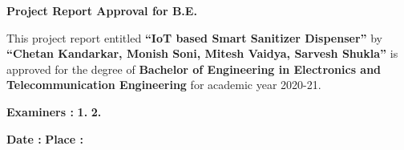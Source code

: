 \newpage
\thispagestyle{empty}
\begin{center}
\LARGE \textbf { {Project Report Approval for B.E.} }
\end{center}

	\vspace{0.5cm}


      This project report entitled \textbf{\textquotedblleft  IoT based Smart Sanitizer Dispenser\textquotedblright} by \textbf{\textquotedblleft Chetan Kandarkar, Monish Soni, Mitesh Vaidya, Sarvesh Shukla\textquotedblright} is approved for the degree of \textbf{Bachelor of Engineering in Electronics and Telecommunication Engineering} for academic year 2020-21.

	\vspace{2.00cm}
\begin{flushright}
	 \hspace{70.00mm}\textbf{Examiners :} \hspace{30.00mm}
	 \vspace{1.00cm}
	\linebreak \hspace{55.00mm} \textbf{1.}  \hspace{45.00mm}
	\vspace{1.00cm}
\linebreak \hspace{55.00mm} \textbf{2.}  \hspace{45.00mm}
\vspace{1.00cm}
	 
\end{flushright}
\vspace{1.00cm}


\begin{flushleft} 
\textbf {Date :}
\vspace{0.5cm}
\linebreak\textbf{Place :}
\end{flushleft}
